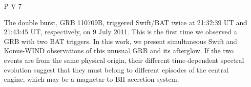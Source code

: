 P-V-7


\bigskip



\bigskip

\noindent The double burst, GRB 110709B, triggered Swift/BAT twice at 21:32:39 UT and
21:43:45 UT, respectively, on 9 July 2011. This is the first time we observed a
GRB with two BAT triggers. In this work, we present simultaneous Swift and
Konus-WIND observations of this unusual GRB and its afterglow. If the two
events are from the same physical origin, their different time-dependent
spectral evolution suggest that they must belong to different episodes of the
central engine, which may be a magnetar-to-BH accretion system.

